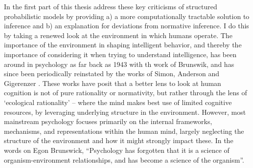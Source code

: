 
In the first part of this thesis address these key criticisms of structured probabilistic models by providing a) a more computationally tractable solution to inference and b) an explanation for deviations from normative inference. I do this by taking a renewed look at the environment in which humans operate. The importance of the environment in shaping intelligent behavior, and thereby the importance of considering it when trying to understand intelligence, has been around in psychology as far back as 1943 with th work of Brunswik\cite{brunswik1943organismic}, and has since been periodically reinstated by the works of Simon\cite{simon1956rational}, Anderson\cite{anderson1990adaptive} and Gigerenzer \cite{gigerenzer1999simple}. These works have posit that a better lens to look at human cognition is not of pure rationality or normativity, but rather through the lens of `ecological rationality' -- where the mind makes best use of limited cognitive resources, by leveraging underlying structure in the environment. However, most mainstream psychology focuses primarily on the internal frameworks, mechanisms, and representations within the human mind, largely neglecting the structure of the environment and how it might strongly impact these. In the words on Egon Brunswick, ``Psychology has forgotten that it is a science of organism-environment relationships, and has become a science of the organism''.  

